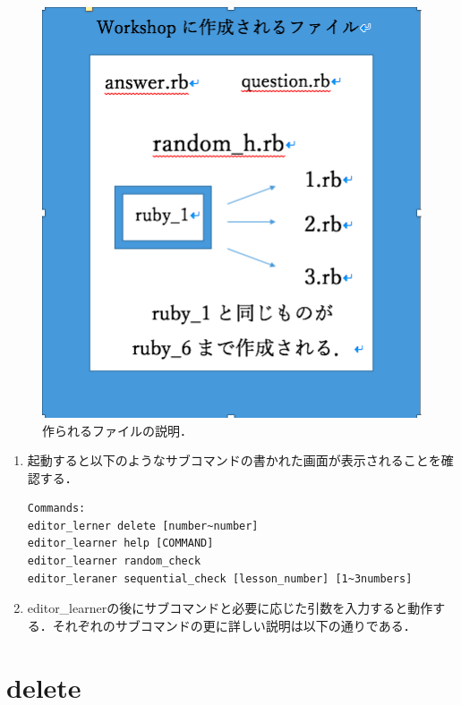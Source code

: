 \begin{figure}[H]
\centering
\begin{center}
\includegraphics[width=150mm]{../../picture/mkdir.png}
\end{center}
\caption{作られるファイルの説明．\label{sample}}

\label{fig:This}
\end{figure}

\begin{enumerate}
\def\labelenumi{\arabic{enumi}.}
\item
  起動すると以下のようなサブコマンドの書かれた画面が表示されることを確認する．

\begin{verbatim}
Commands:
editor_lerner delete [number~number]
editor_learner help [COMMAND]
editor_learner random_check
editor_leraner sequential_check [lesson_number] [1~3numbers]
\end{verbatim}
\item
  editor\_learnerの後にサブコマンドと必要に応じた引数を入力すると動作する．それぞれのサブコマンドの更に詳しい説明は以下の通りである．
\end{enumerate}

    \section{delete}\label{delete}

